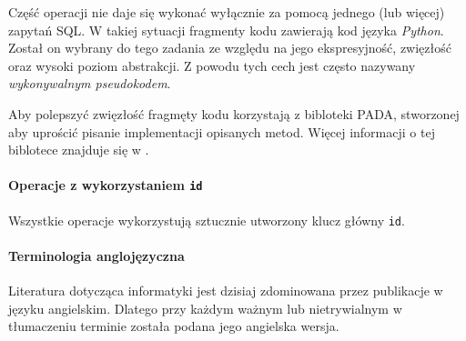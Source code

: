Część operacji nie daje się wykonać wyłącznie za pomocą jednego (lub więcej) zapytań SQL.
W takiej sytuacji fragmenty kodu zawierają kod języka \emph{Python}.
Został on wybrany do tego zadania ze względu na jego ekspresyjność, zwięzłość oraz wysoki poziom abstrakcji.
Z powodu tych cech jest często nazywany \emph{wykonywalnym pseudokodem}.

Aby polepszyć zwięzłość fragmęty kodu korzystają z bibloteki PADA, stworzonej aby uprościć pisanie implementacji opisanych metod. 
Więcej informacji o tej biblotece znajduje się w .

\paragraph{Operacje z wykorzystaniem \texttt{id}} Wszystkie operacje wykorzystują sztucznie utworzony klucz główny \texttt{id}. 

\paragraph{Terminologia anglojęzyczna} 
Literatura dotycząca informatyki jest dzisiaj zdominowana przez publikacje w języku angielskim. Dlatego przy każdym ważnym lub nietrywialnym w tłumaczeniu terminie została podana jego angielska wersja. 

